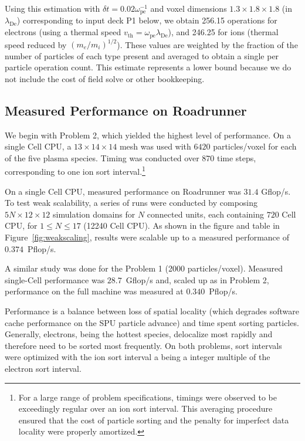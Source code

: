 \documentclass[journal,twoside]{IEEEtran}
\newcommand{\fig}[1]{Figure~\ref{fig:#1}}
\newcommand{\lde}      {\lambda_{\mathrm{De}}}
\newcommand{\wpe}      {\omega_{\mathrm{pe}}}
\begin{document}
Using this estimation with $\delta t = 0.02 \wpe^{-1}$ and voxel
dimensions $1.3 \times 1.8 \times 1.8$ (in $\lde$) corresponding to
input deck P1 below, we obtain 256.15 operations for electrons (using
a thermal speed $v_{\mathrm{th}} = \wpe \lde$), and 246.25 for ions
(thermal speed reduced by $(m_e/m_i)^{1/2}$).  These values are
weighted by the fraction of the number of particles of each type
present and averaged to obtain a single per particle operation count.
This estimate represents a lower bound because we do not include the
cost of field solve or other bookkeeping.

\subsection{Measured Performance on Roadrunner}

We begin with Problem 2, which yielded the highest level of
performance.  On a single Cell CPU, a $13 \times 14 \times 14$ mesh
was used with $6420$ particles/voxel for each of the five plasma
species.  Timing was conducted over $870$ time steps, corresponding to
one ion sort interval.\footnote{For a large range of problem
specifications, timings were observed to be exceedingly regular over
an ion sort interval.  This averaging procedure ensured that the cost
of particle sorting and the penalty for imperfect data locality were
properly amortized.}

On a single Cell CPU, measured performance on Roadrunner was $31.4$
Gflop/s.  To test weak scalability, a series of runs were conducted by
composing $5N \times 12 \times 12$ simulation domains for $N$
connected units, each containing $720$ Cell CPU, for $1 \le N \le 17$
(12240 Cell CPU).  As shown in the figure and table in \fig{weakscaling}, 
results were scalable up to a measured performance of $0.374$~Pflop/s.

A similar study was done for the Problem 1 (2000 particles/voxel).
Measured single-Cell performance was $28.7$~Gflop/s and, scaled up as
in Problem 2, performance on the full machine was measured at
$0.340$~Pflop/s.

Performance is a balance between loss of spatial locality (which
degrades software cache performance on the SPU particle advance) and
time spent sorting particles.  Generally, electrons, being the hottest
species, delocalize most rapidly and therefore need to be sorted most
frequently.  On both problems, sort intervals were optimized with the
ion sort interval a being a integer multiple of the electron sort
interval.
\end{document}
